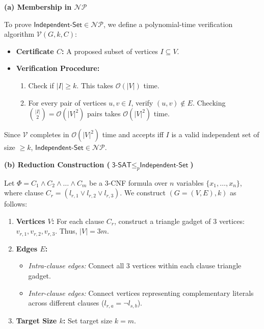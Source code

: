\documentclass[11pt, a4paper]{article}
\newcommand{\Onotation}[1]{\mathcal{O}\left(#1\right)}
\newcommand{\solsection}[1]{\vspace{2pt}\noindent\textbf{\textcolor{primary}{#1}}\par\vspace{1pt}}
\begin{document}
\begin{solutionbox}
  \solsection{(a) Membership in $\mathcal{NP}$}
  To prove $\textsf{Independent-Set} \in \mathcal{NP}$, we define a polynomial-time verification algorithm $\mathcal{V}(G, k, C)$:
  \begin{itemize}[leftmargin=1.4em, itemsep=0.5pt]
    \item \textbf{Certificate $C$:} A proposed subset of vertices $I \subseteq V$.
    \item \textbf{Verification Procedure:}
    \begin{enumerate}[label=\arabic*., itemsep=0.5pt]
      \item Check if $|I| \ge k$. This takes $\Onotation{|V|}$ time.
      \item For every pair of vertices $u, v \in I$, verify $(u, v) \notin E$. Checking $\binom{|I|}{2} = \Onotation{|V|^2}$ pairs takes $\Onotation{|V|^2}$ time.
    \end{enumerate}
  \end{itemize}
  Since $\mathcal{V}$ completes in $\Onotation{|V|^2}$ time and accepts iff $I$ is a valid independent set of size $\ge k$, $\textsf{Independent-Set} \in \mathcal{NP}$.

  \solsection{(b) Reduction Construction ($\textsf{3-SAT} \le_p \textsf{Independent-Set}$)}
  Let $\Phi = C_1 \land C_2 \land \dots \land C_m$ be a 3-CNF formula over $n$ variables $\{x_1, \dots, x_n\}$, where clause $C_r = (l_{r,1} \lor l_{r,2} \lor l_{r,3})$. We construct $(G = (V, E), k)$ as follows:

  \begin{enumerate}[label=1., itemsep=0.5pt]
    \item \textbf{Vertices $V$:} For each clause $C_r$, construct a triangle gadget of 3 vertices: $v_{r,1}, v_{r,2}, v_{r,3}$. Thus, $|V| = 3m$.
    \item \textbf{Edges $E$:}
    \begin{itemize}[itemsep=0.5pt]
      \item \emph{Intra-clause edges:} Connect all 3 vertices within each clause triangle gadget.
      \item \emph{Inter-clause edges:} Connect vertices representing complementary literals across different clauses ($l_{r,a} = \neg l_{s,b}$).
    \end{itemize}
    \item \textbf{Target Size $k$:} Set target size $k = m$.
  \end{enumerate}


\end{solutionbox}
\end{document}
